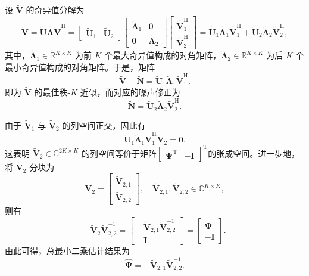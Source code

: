 设 \( \tilde{\mathbf{V}} \) 的奇异值分解为
\[
    \tilde{\mathbf{V}}
    = \tilde{\mathbf{U}} \tilde{\mathbf{\Lambda}} \tilde{\mathbf{V}}^{\mathrm{H}}
    = \begin{bmatrix}
        \tilde{\mathbf{U}}_1 & \tilde{\mathbf{U}}_2
    \end{bmatrix}
    \begin{bmatrix}
        \tilde{\mathbf{\Lambda}}_1 & \mathbf{0}                 \\
        \mathbf{0}                 & \tilde{\mathbf{\Lambda}}_2
    \end{bmatrix}
    \begin{bmatrix}
        \tilde{\mathbf{V}}_1^{\mathrm{H}} \\
        \tilde{\mathbf{V}}_2^{\mathrm{H}}
    \end{bmatrix}
    = \tilde{\mathbf{U}}_1 \tilde{\mathbf{\Lambda}}_1 \tilde{\mathbf{V}}_1^{\mathrm{H}}
    + \tilde{\mathbf{U}}_2 \tilde{\mathbf{\Lambda}}_2 \tilde{\mathbf{V}}_2^{\mathrm{H}},
\]
其中，\( \tilde{\mathbf{\Lambda}}_1 \in \mathbb{R}^{K \times K} \) 为前 \( K \) 个最大奇异值构成的对角矩阵，\( \tilde{\mathbf{\Lambda}}_2 \in \mathbb{R}^{K \times K} \) 为后 \( K \) 个最小奇异值构成的对角矩阵。于是，矩阵
\[
    \tilde{\mathbf{V}} - \tilde{\mathbf{N}} = \tilde{\mathbf{U}}_1 \tilde{\mathbf{\Lambda}}_1 \tilde{\mathbf{V}}_1^{\mathrm{H}}.
\]
即为 \( \tilde{\mathbf{V}} \) 的最佳秩-\( K \) 近似，而对应的噪声修正为
\[
    \tilde{\mathbf{N}} = \tilde{\mathbf{U}}_2 \tilde{\mathbf{\Lambda}}_2 \tilde{\mathbf{V}}_2^{\mathrm{H}}.
\]

由于 \(\tilde{\mathbf{V}}_1\) 与 \(\tilde{\mathbf{V}}_2\) 的列空间正交，因此有
\[
    \tilde{\mathbf{U}}_1 \tilde{\mathbf{\Lambda}}_1 \tilde{\mathbf{V}}_1^{\mathrm{H}} \tilde{\mathbf{V}}_2 = \mathbf{0}.
\]
这表明 \(\tilde{\mathbf{V}}_2 \in \mathbb{C}^{2K \times K}\) 的列空间等价于矩阵\(\begin{bmatrix} \mathbf{\Psi}^{\mathrm{T}} & -\mathbf{I} \end{bmatrix}^{\mathrm{T}}\)的张成空间。进一步地，将 \(\tilde{\mathbf{V}}_2\) 分块为
\[
    \tilde{\mathbf{V}}_2 =
    \begin{bmatrix}
        \tilde{\mathbf{V}}_{2,1} \\
        \tilde{\mathbf{V}}_{2,2}
    \end{bmatrix},
    \quad \tilde{\mathbf{V}}_{2,1}, \tilde{\mathbf{V}}_{2,2} \in \mathbb{C}^{K \times K},
\]
则有
\[
    -\tilde{\mathbf{V}}_2 \tilde{\mathbf{V}}_{2,2}^{-1}
    = \begin{bmatrix}
        -\tilde{\mathbf{V}}_{2,1} \tilde{\mathbf{V}}_{2,2}^{-1} \\
        -\mathbf{I}
    \end{bmatrix}
    = \begin{bmatrix}
        \mathbf{\Psi} \\
        -\mathbf{I}
    \end{bmatrix}.
\]
由此可得，总最小二乘估计结果为
\[
    \hat{\mathbf{\Psi}} = -\tilde{\mathbf{V}}_{2,1} \tilde{\mathbf{V}}_{2,2}^{-1}.
\]

